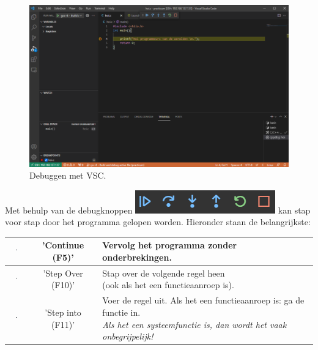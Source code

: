 \begin{enumerate}
\hypertarget{chp:debugknoppen}{}
\begin{figure}[h!]
\captionsetup{justification=centering}
\includegraphics[width=0.8 \linewidth]{figuren/VSCdebugVeld}
\centering
\caption{Debuggen met VSC.}
\label{fig:vscDebugVld}
\end{figure}     
   Met behulp van de debugknoppen \includegraphics[width=0.3 \linewidth]{figuren/VSCDebugKnoppen} kan stap voor stap door het programma gelopen worden. Hieronder staan de belangrijkste:

\begin{table}[h!] %
	\begin{tabular*}{6.6in}{ c | c | l }
		\hline
		\includegraphics[width=0.05\textwidth, height=8mm]{figuren/F5-Continue} & 'Continue (F5)' & Vervolg het programma zonder onderbrekingen. \\ \hline
		\includegraphics[width=0.05\textwidth, height=8mm]{figuren/F10-StepOver} & 'Step Over (F10)' & \specialcell{Stap over de volgende regel heen\\(ook als het een functieaanroep is).}  \\ \hline
		\includegraphics[width=0.05\textwidth, height=8mm]{figuren/F11-StepInto} & 'Step into (F11)' & \specialcell{Voer de regel uit. Als het een functieaanroep is: ga de functie in.\\ \textit{Als het een systeemfunctie is, dan wordt het vaak onbegrijpelijk!}}  \\ \hline
	\end{tabular*}
\end{table}

   
     \end{enumerate}
     
	
